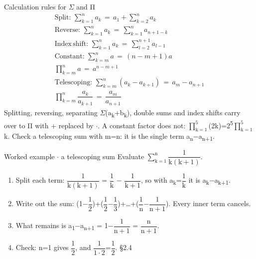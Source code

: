 \documentclass[11pt]{article}
\begin{document}
\begin{keepsection}
\begin{equationcard}{Calculation rules for \ensuremath{\Sigma} and Π}
\[ \begin{gathered} \text{Split}:\, \sum_{{k}=1}^{{n}} {a}_{{k}}\, =\, {a}_{1}+\sum_{{k}=2}^{{n}} {a}_{{k}} \\ \text{Reverse}:\, \sum_{{k}=1}^{{n}} {a}_{{k}}\, =\, \sum_{{k}=1}^{{n}} {a}_{{n}+1-{k}} \\ \text{Index}\, \text{shift}:\, \sum_{{k}=1}^{{n}} {a}_{{k}}\, =\, \sum_{{l}=2}^{{n}+1} {a}_{{l}-1} \\ \text{Constant}:\, \sum_{{k}={m}}^{{n}} {a}\, =\, ({n}-{m}+1){a} \\ \prod_{{k}={m}}^{{n}} {a}\, =\, {a}^{{n}-{m}+1} \\ \text{Telescoping}:\, \sum_{{k}={m}}^{{n}} ({a}_{{k}}-{a}_{{k}+1})\, =\, {a}_{{m}}-{a}_{{n}+1} \\ \prod_{{k}={m}}^{{n}} \dfrac{{a}_{{k}}}{{a}_{{k}+1}}\, =\, \dfrac{{a}_{{m}}}{{a}_{{n}+1}} \end{gathered} \]
{\small Splitting, reversing, separating \ensuremath{\Sigma}(a\textsubscript{k}+b\textsubscript{k}), double sums and index shifts carry over to Π with + replaced by \ensuremath{\cdot}. A constant factor does not: $\prod_{\mathrm{k}=1}^{5} $(2k)=2\textsuperscript{5}$\prod_{\mathrm{k}=1}^{5} $k. Check a telescoping sum with m=n: it is the single term a\textsubscript{n}\ensuremath{-}a\textsubscript{n+1}.}
\end{equationcard}

\begin{workedbox}{Worked example \ensuremath{\cdot} a telescoping sum}
Evaluate $\sum_{\mathrm{k}=1}^{\mathrm{n}} ${\small\ensuremath{\dfrac{1}{\mathrm{k}(\mathrm{k}+1)}}}.

\begin{enumerate}
\item Split each term: {\small\ensuremath{\dfrac{1}{\mathrm{k}(\mathrm{k}+1)}}} = {\small\ensuremath{\dfrac{1}{\mathrm{k}}}} \ensuremath{-} {\small\ensuremath{\dfrac{1}{\mathrm{k}+1}}}, so with a\textsubscript{k}={\small\ensuremath{\dfrac{1}{\mathrm{k}}}} it is a\textsubscript{k}\ensuremath{-}a\textsubscript{k+1}.
\item Write out the sum: (1\ensuremath{-}{\small\ensuremath{\dfrac{1}{2}}})+({\small\ensuremath{\dfrac{1}{2}}}\ensuremath{-}{\small\ensuremath{\dfrac{1}{3}}})+…+({\small\ensuremath{\dfrac{1}{\mathrm{n}}}}\ensuremath{-}{\small\ensuremath{\dfrac{1}{\mathrm{n}+1}}}). Every inner term cancels.
\item What remains is a\textsubscript{1}\ensuremath{-}a\textsubscript{n+1} = 1\ensuremath{-}{\small\ensuremath{\dfrac{1}{\mathrm{n}+1}}} = {\small\ensuremath{\dfrac{\mathrm{n}}{\mathrm{n}+1}}}.
\item Check: n=1 gives {\small\ensuremath{\dfrac{1}{2}}}, and {\small\ensuremath{\dfrac{1}{1\cdot 2}}}={\small\ensuremath{\dfrac{1}{2}}}. \hfill{\small\color{FAUblue}§2.4}
\end{enumerate}
\end{workedbox}


\end{keepsection}
\end{document}
